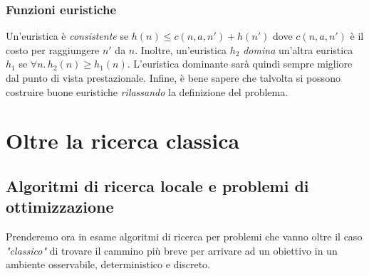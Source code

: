 \documentclass[11pt,oneside]{book}
\begin{document}
\subsection{Funzioni euristiche}
Un'euristica è \textit{consistente} se $h(n) \leq c(n,a,n') + h(n')$ dove $c(n,a,n')$ è il costo per raggiungere $n'$ da $n$. Inoltre, un'euristica $h_2$ \textit{domina} un'altra euristica $h_1$ se $\forall n. \, h_2(n) \geq h_1(n)$. L'euristica dominante sarà quindi sempre migliore dal punto di vista prestazionale. Infine, è bene sapere che talvolta si possono costruire buone euristiche \textit{rilassando} la definizione del problema.


\chapter{Oltre la ricerca classica}

\section{Algoritmi di ricerca locale e problemi di ottimizzazione}
Prenderemo ora in esame algoritmi di ricerca per problemi che vanno oltre il caso \textit{"classico"} di trovare il cammino più breve per arrivare ad un obiettivo in un ambiente osservabile, deterministico e discreto.
\end{document}
